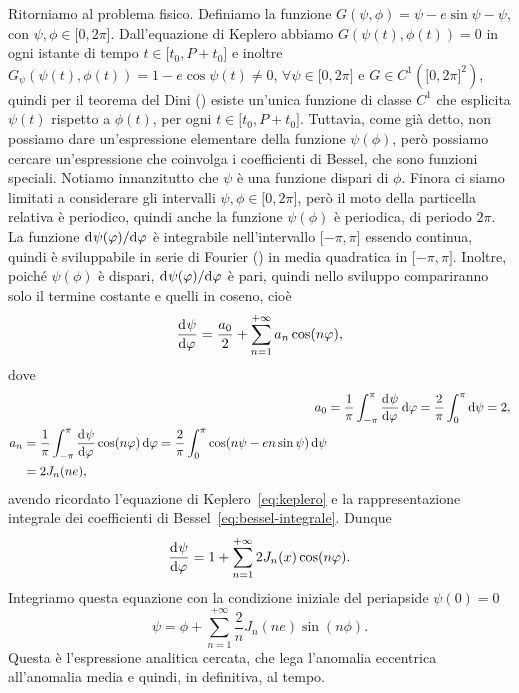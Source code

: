 Ritorniamo al problema fisico. Definiamo la funzione $G(\psi,\phi) = \psi -
e\sin\psi - \psi$, con $\psi,\phi\in\mathopen{[}0,
2\pi\mathclose{]}$. Dall'equazione di Keplero abbiamo $G(\psi(t),\phi(t)) = 0$
in ogni istante di tempo $t\in\mathopen{[}t_0,P+t_0\mathclose{]}$ e inoltre
$G_\psi(\psi(t),\phi(t)) = 1 - e\cos\psi(t) \neq 0$,
$\forall\psi\in\mathopen{[}0, 2\pi\mathclose{]}$ e $G\in C^1(\mathopen{[}0,
2\pi\mathclose{]}^2)$, quindi per il teorema del Dini
(\textcite[267]{demarco:analisi2}) esiste un'unica funzione di classe $C^1$ che
esplicita $\psi(t)$ rispetto a $\phi(t)$, per ogni
$t\in\mathopen{[}t_0,P+t_0\mathclose{]}$. Tuttavia, come già detto, non possiamo
dare un'espressione elementare della funzione $\psi(\phi)$, però possiamo
cercare un'espressione che coinvolga i coefficienti di Bessel, che sono funzioni
speciali. Notiamo innanzitutto che $\psi$ è una funzione dispari di
$\phi$. Finora ci siamo limitati a considerare gli intervalli
$\psi,\phi\in\mathopen{[}0, 2\pi\mathclose{]}$, però il moto della particella
relativa è periodico, quindi anche la funzione $\psi(\phi)$ è periodica, di
periodo $2\pi$.  La funzione $\mathrm{d}^{}\psi(\varphi) / \mathrm{d} {\varphi}^{}$ è integrabile
nell'intervallo $\mathopen{[}-\pi, \pi\mathclose{]}$ essendo continua, quindi è
sviluppabile in serie di Fourier (\textcite[440]{demarco:analisi2}) in media
quadratica in $\mathopen{[}-\pi, \pi\mathclose{]}$. Inoltre, poiché $\psi(\phi)$
è dispari, $\mathrm{d}^{}\psi(\varphi) / \mathrm{d} {\varphi}^{}$ è pari, quindi nello sviluppo
compariranno solo il termine costante e quelli in coseno, cioè
\begin{equation}
  \frac{{\mathop{}\!\mathrm{d}^{}}\psi}{\mathop{}\!\mathrm{d} {\varphi}^{}} = \frac{a_0}{2} + \sum_{n=1}^{+\infty}a_n\cos(n\varphi),
\end{equation}
dove
\begin{align}
  a_0 &= \frac{1}{\pi}\int_{-\pi}^{\pi}\toder{\psi}{\phi}\dd\phi =
  \frac{2}{\pi}\int_0^\pi\dd\psi = 2,\\
  \begin{split}
    a_n &= \frac{1}{\pi}\int_{-\pi}^\pi\toder{\psi}{\phi}\cos(n\phi)\dd\phi =
    \frac{2}{\pi}\int_0^\pi\cos(n\psi - en\sin\psi)\dd\psi \\
    &= 2J_n(ne),
  \end{split}
\end{align}
avendo ricordato l'equazione di Keplero~\eqref{eq:keplero} e la rappresentazione
integrale dei coefficienti di Bessel~\eqref{eq:bessel-integrale}. Dunque
\begin{equation}
  \frac{{\mathop{}\!\mathrm{d}^{}}\psi}{\mathop{}\!\mathrm{d} {\varphi}^{}} = 1 + \sum_{n=1}^{+\infty}2J_n(x)\cos(n\varphi).
\end{equation}
Integriamo questa equazione con la condizione iniziale del periapside $\psi(0) =
0$
\begin{equation}
  \psi = \phi + \sum_{n=1}^{+\infty}\frac{2}{n}J_n(ne)\sin(n\phi).
\end{equation}
Questa è l'espressione analitica cercata, che lega l'anomalia eccentrica
all'anomalia media e quindi, in definitiva, al tempo.

